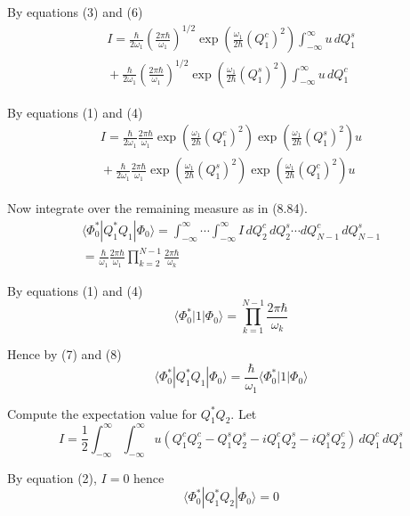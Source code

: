 \documentclass[12pt]{article}
\begin{document}
By equations (3) and (6)
\begin{multline*}
I=
\frac{\hbar}{2\omega_1}\left(\frac{2\pi\hbar}{\omega_1}\right)^{1/2}
\exp\left(\frac{\omega_1}{2\hbar}(Q_1^c)^2\right)
\int_{-\infty}^\infty u\,dQ_1^s
\\
{}+\frac{\hbar}{2\omega_1}\left(\frac{2\pi\hbar}{\omega_1}\right)^{1/2}
\exp\left(\frac{\omega_1}{2\hbar}(Q_1^s)^2\right)
\int_{-\infty}^\infty u\,dQ_1^c
\end{multline*}

By equations (1) and (4)
\begin{multline*}
I=
\frac{\hbar}{2\omega_1}
\frac{2\pi\hbar}{\omega_1}
\exp\left(\frac{\omega_1}{2\hbar}(Q_1^c)^2\right)
\exp\left(\frac{\omega_1}{2\hbar}(Q_1^s)^2\right)
u
\\
{}+
\frac{\hbar}{2\omega_1}
\frac{2\pi\hbar}{\omega_1}
\exp\left(\frac{\omega_1}{2\hbar}(Q_1^s)^2\right)
\exp\left(\frac{\omega_1}{2\hbar}(Q_1^c)^2\right)
u
\end{multline*}

Now integrate over the remaining measure as in (8.84).
\begin{multline*}
\langle\Phi_0^*|Q_1^*Q_1|\Phi_0\rangle
=\int_{-\infty}^\infty\cdots\int_{-\infty}^\infty I\,dQ_2^c\,dQ_2^s\cdots dQ_{N-1}^c\,dQ_{N-1}^s
\\
=\frac{\hbar}{\omega_1}
\frac{2\pi\hbar}{\omega_1}
\prod_{k=2}^{N-1}\frac{2\pi\hbar}{\omega_k}
\tag{7}
\end{multline*}

By equations (1) and (4)
\begin{equation*}
\langle\Phi_0^*|1|\Phi_0\rangle
=\prod_{k=1}^{N-1}\frac{2\pi\hbar}{\omega_k}
\tag{8}
\end{equation*}

Hence by (7) and (8)
\begin{equation*}
\langle\Phi_0^*|Q_1^*Q_1|\Phi_0\rangle=\frac{\hbar}{\omega_1}\langle\Phi_0^*|1|\Phi_0\rangle
\end{equation*}

Compute the expectation value for $Q_1^*Q_2$.
Let
\begin{equation*}
I=\frac{1}{2}\int_{-\infty}^\infty\int_{-\infty}^\infty
u\left(Q_1^cQ_2^c-Q_1^sQ_2^s-iQ_1^cQ_2^s-iQ_1^sQ_2^c\right)
\,dQ_1^c\,dQ_1^s
\end{equation*}

By equation (2), $I=0$ hence
\begin{equation*}
\langle\Phi_0^*|Q_1^*Q_2|\Phi_0\rangle=0
\end{equation*}
\end{document}
